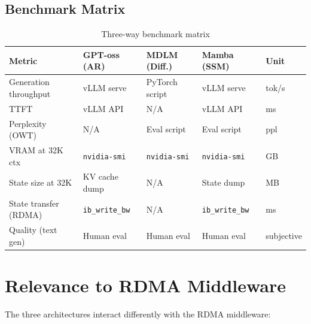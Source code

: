 \documentclass[11pt,letterpaper]{article}
\begin{document}
\subsection{Benchmark Matrix}

\begin{table}[htbp]
\centering
\caption{Three-way benchmark matrix}
\label{tab:benchmark-matrix}
\begin{tabular}{@{}lllll@{}}
\toprule
\textbf{Metric} & \textbf{GPT-oss (AR)} & \textbf{MDLM (Diff.)} & \textbf{Mamba (SSM)} & \textbf{Unit} \\
\midrule
Generation throughput & vLLM serve & PyTorch script & vLLM serve & tok/s \\
TTFT & vLLM API & N/A & vLLM API & ms \\
Perplexity (OWT) & N/A & Eval script & Eval script & ppl \\
VRAM at 32K ctx & \texttt{nvidia-smi} & \texttt{nvidia-smi} & \texttt{nvidia-smi} & GB \\
State size at 32K & KV cache dump & N/A & State dump & MB \\
State transfer (RDMA) & \texttt{ib\_write\_bw} & N/A & \texttt{ib\_write\_bw} & ms \\
Quality (text gen) & Human eval & Human eval & Human eval & subjective \\
\bottomrule
\end{tabular}
\end{table}

\section{Relevance to RDMA Middleware}
\label{sec:relevance}

The three architectures interact differently with the RDMA middleware:
\end{document}
